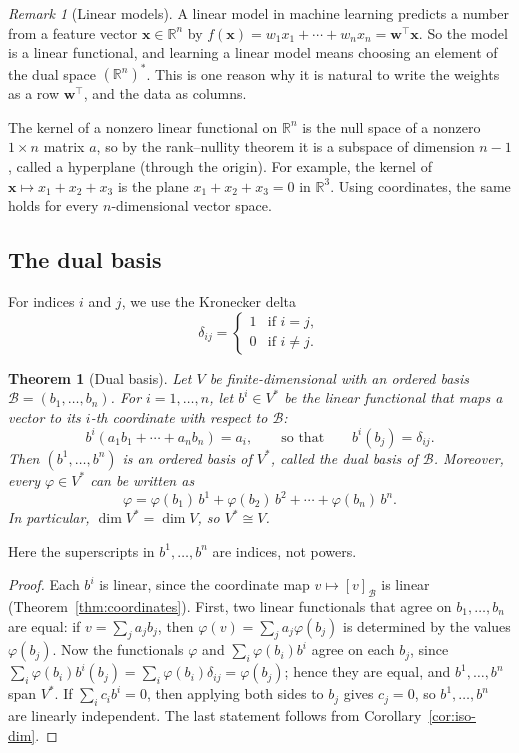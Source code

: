 \documentclass[11pt]{article}
\theoremstyle{definition}
\theoremstyle{plain}
\newtheorem{theorem}[definition]{Theorem}
\theoremstyle{remark}
\newtheorem{remark}[definition]{Remark}
\begin{document}
\begin{remark}[Linear models]
    A linear model in machine learning predicts a number from a feature vector $\mathbf{x} \in \mathbb{R}^n$ by $f(\mathbf{x}) = w_1 x_1 + \cdots + w_n x_n = \mathbf{w}^\top \mathbf{x}$. So the model is a linear functional, and learning a linear model means choosing an element of the dual space $(\mathbb{R}^n)^*$. This is one reason why it is natural to write the weights as a row $\mathbf{w}^\top$, and the data as columns.
\end{remark}

The kernel of a nonzero linear functional on $\mathbb{R}^n$ is the null space of a nonzero $1 \times n$ matrix $a$, so by the rank--nullity theorem it is a subspace of dimension $n - 1$, called a hyperplane (through the origin). For example, the kernel of $\mathbf{x} \mapsto x_1 + x_2 + x_3$ is the plane $x_1 + x_2 + x_3 = 0$ in $\mathbb{R}^3$. Using coordinates, the same holds for every $n$-dimensional vector space.

\subsection{The dual basis}

For indices $i$ and $j$, we use the Kronecker delta
\[\delta_{ij} = \begin{cases} 1 & \text{if } i = j, \\ 0 & \text{if } i \neq j. \end{cases}\]

\begin{theorem}[Dual basis]\label{thm:dual-basis}
    Let $V$ be finite-dimensional with an ordered basis $\mathcal{B} = (b_1, \ldots, b_n)$. For $i = 1, \ldots, n$, let $b^i \in V^*$ be the linear functional that maps a vector to its $i$-th coordinate with respect to $\mathcal{B}$:
    \[b^i(a_1 b_1 + \cdots + a_n b_n) = a_i, \qquad \text{so that} \qquad b^i(b_j) = \delta_{ij}.\]
    Then $(b^1, \ldots, b^n)$ is an ordered basis of $V^*$, called the dual basis of $\mathcal{B}$. Moreover, every $\varphi \in V^*$ can be written as
    \[\varphi = \varphi(b_1)\, b^1 + \varphi(b_2)\, b^2 + \cdots + \varphi(b_n)\, b^n.\]
    In particular, $\dim V^* = \dim V$, so $V^* \cong V$.
\end{theorem}

Here the superscripts in $b^1, \ldots, b^n$ are indices, not powers.

\begin{proof}
    Each $b^i$ is linear, since the coordinate map $v \mapsto [v]_{\mathcal{B}}$ is linear (Theorem~\ref{thm:coordinates}). First, two linear functionals that agree on $b_1, \ldots, b_n$ are equal: if $v = \sum_j a_j b_j$, then $\varphi(v) = \sum_j a_j \varphi(b_j)$ is determined by the values $\varphi(b_j)$. Now the functionals $\varphi$ and $\sum_i \varphi(b_i) b^i$ agree on each $b_j$, since $\sum_i \varphi(b_i) b^i(b_j) = \sum_i \varphi(b_i)\delta_{ij} = \varphi(b_j)$; hence they are equal, and $b^1, \ldots, b^n$ span $V^*$. If $\sum_i c_i b^i = 0$, then applying both sides to $b_j$ gives $c_j = 0$, so $b^1, \ldots, b^n$ are linearly independent. The last statement follows from Corollary~\ref{cor:iso-dim}.
\end{proof}
\end{document}

